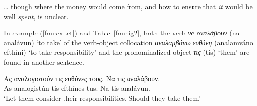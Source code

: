 \documentclass[output=paper]{langsci/langscibook}
\begin{document}
\ea\label{fou:exMoney}
  \ldots{} though where the money would come from, and how to ensure that\textit{ it}
would be well \textit{spent}, is unclear.
\z

In example (\ref{fou:exLet}) %
and Table~\ref{fou:fig2}, both the verb \textit{να αναλάβουν} (na analávun) `to take' of the verb-object collocation \textit{αναλαμβάνω ευθύνη} (analamváno efthíni) `to take responsibility' and the pronominalized object \textit{τις} (tis) `them' are found in another sentence.

\ea\label{fou:exLet}
\gll Ας αναλογιστούν τις ευθύνες τους. Να τις αναλάβουν. \\
As analogistún tis efthínes tus. Na tis analávun. \\
\glt `Let them consider their responsibilities. Should they take them.'
\z

\begin{table}[h]
 \caption{\label{fou:fig2}Identification of a verbal collocation}
\end{table} 
\end{document}
